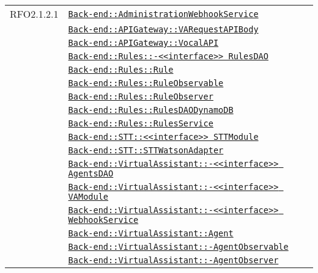\begin{longtable}{|>{\centering}m{3cm}|m{10cm}<{\centering}|}
RFO2.1.2.1 & \hyperref[Back-end::AdministrationWebhookService]{\texttt{Back-end::AdministrationWebhookService}}\\
& \hyperref[Back-end::APIGateway::VARequestAPIBody]{\texttt{Back-end::APIGateway::VARequestAPIBody}}\\
& \hyperref[Back-end::APIGateway::VocalAPI]{\texttt{Back-end::APIGateway::VocalAPI}}\\
& \hyperref[Back-end::Rules::<<interface>> RulesDAO]{\texttt{Back-end::Rules::-\linebreak <<interface>> RulesDAO}}\\
& \hyperref[Back-end::Rules::Rule]{\texttt{Back-end::Rules::Rule}}\\
& \hyperref[Back-end::Rules::RuleObservable]{\texttt{Back-end::Rules::RuleObservable}}\\
& \hyperref[Back-end::Rules::RuleObserver]{\texttt{Back-end::Rules::RuleObserver}}\\
& \hyperref[Back-end::Rules::RulesDAODynamoDB]{\texttt{Back-end::Rules::RulesDAODynamoDB}}\\
& \hyperref[Back-end::Rules::RulesService]{\texttt{Back-end::Rules::RulesService}}\\
& \hyperref[Back-end::STT::<<interface>> STTModule]{\texttt{Back-end::STT::<<interface>> STTModule}}\\
& \hyperref[Back-end::STT::STTWatsonAdapter]{\texttt{Back-end::STT::STTWatsonAdapter}}\\
& \hyperref[Back-end::VirtualAssistant::<<interface>> AgentsDAO]{\texttt{Back-end::VirtualAssistant::-\linebreak <<interface>> AgentsDAO}}\\
& \hyperref[Back-end::VirtualAssistant::<<interface>> VAModule]{\texttt{Back-end::VirtualAssistant::-\linebreak <<interface>> VAModule}}\\
& \hyperref[Back-end::VirtualAssistant::<<interface>> WebhookService]{\texttt{Back-end::VirtualAssistant::-\linebreak <<interface>> WebhookService}}\\
& \hyperref[Back-end::VirtualAssistant::Agent]{\texttt{Back-end::VirtualAssistant::Agent}}\\
& \hyperref[Back-end::VirtualAssistant::AgentObservable]{\texttt{Back-end::VirtualAssistant::-\linebreak AgentObservable}}\\
& \hyperref[Back-end::VirtualAssistant::AgentObserver]{\texttt{Back-end::VirtualAssistant::-\linebreak AgentObserver}}\\

\end{longtable}
